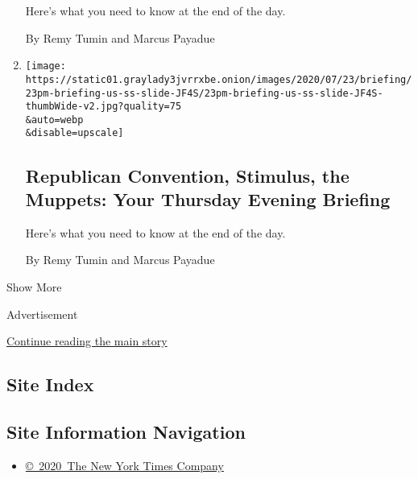 \begin{enumerate}
  Here's what you need to know at the end of the day.

  By Remy Tumin and Marcus Payadue
\item
  \href{/2020/07/23/briefing/republican-convention-stimulus-the-muppets.html}{}

  \texttt{[image: https://static01.graylady3jvrrxbe.onion/images/2020/07/23/briefing/23pm-briefing-us-ss-slide-JF4S/23pm-briefing-us-ss-slide-JF4S-thumbWide-v2.jpg?quality=75\\\&auto=webp\\\&disable=upscale]}

  \hypertarget{republican-convention-stimulus-the-muppets-your-thursday-evening-briefing}{%
  \subsection{Republican Convention, Stimulus, the Muppets: Your
  Thursday Evening
  Briefing}\label{republican-convention-stimulus-the-muppets-your-thursday-evening-briefing}}

  Here's what you need to know at the end of the day.

  By Remy Tumin and Marcus Payadue
\end{enumerate}

Show More

Advertisement

\protect\hyperlink{after-mid2}{Continue reading the main story}

\hypertarget{site-index}{%
\subsection{Site Index}\label{site-index}}

\hypertarget{site-information-navigation}{%
\subsection{Site Information
Navigation}\label{site-information-navigation}}

\begin{itemize}
\tightlist
\item
  \href{https://help.nytimes3xbfgragh.onion/hc/en-us/articles/115014792127-Copyright-notice}{©~2020~The
  New York Times Company}
\end{itemize}

